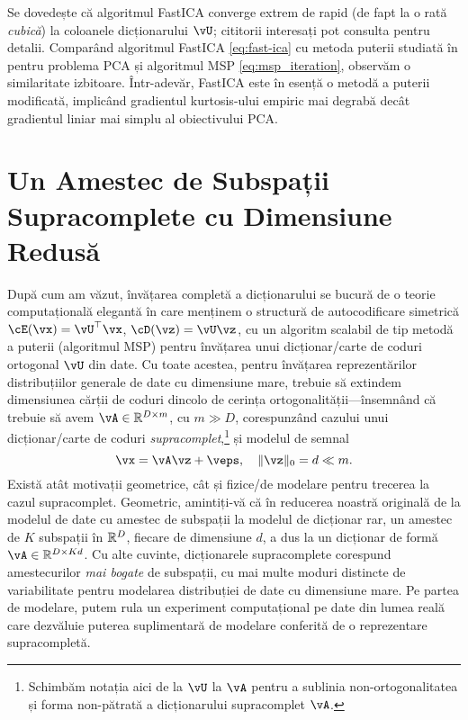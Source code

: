 \documentclass[../../book-main_ro.tex]{subfiles}
\begin{document}
Se dovedește că algoritmul FastICA converge extrem de rapid (de fapt la
o rată \textit{cubică}) la coloanele dicționarului $\vU$; cititorii interesați
pot consulta \cite{hyvarinen-1997} pentru detalii. 
Comparând algoritmul FastICA \eqref{eq:fast-ica} cu metoda puterii studiată
în  pentru problema PCA și algoritmul MSP
\eqref{eq:msp_iteration}, observăm o similaritate izbitoare. Într-adevăr, FastICA este în esență o metodă a puterii modificată, implicând gradientul kurtosis-ului empiric mai degrabă decât gradientul liniar mai simplu al obiectivului PCA.


\section{Un Amestec de Subspații Supracomplete cu Dimensiune Redusă}
\label{sec:dictionary_learning}
După cum am văzut, învățarea completă a dicționarului se bucură de o teorie computațională elegantă în care menținem o structură de autocodificare simetrică $\cE(\vx) = \vU^\top \vx$, $\cD(\vz) = \vU \vz$, cu un algoritm scalabil de tip metodă a puterii (algoritmul MSP) pentru învățarea unui dicționar/carte de coduri ortogonal $\vU$ din date. Cu toate acestea, pentru învățarea reprezentărilor distribuțiilor generale de date cu dimensiune mare, trebuie să extindem dimensiunea cărții de coduri dincolo de cerința ortogonalității---însemnând că trebuie să avem $\vA \in \R^{D \times m}$, cu $m \gg D$, corespunzând cazului unui dicționar/carte de coduri \textit{supracomplet},\footnote{Schimbăm notația aici de la $\vU$ la $\vA$ pentru a sublinia non-ortogonalitatea și forma non-pătrată a dicționarului supracomplet $\vA$.} și modelul de semnal
\begin{equation}\label{eq:model-DL-overcomplete}
    \vx =  \vA \vz + \veps,
    \quad
    \norm{\vz}_0 = d \ll m.
\end{equation}
Există atât motivații geometrice, cât și fizice/de modelare pentru trecerea la cazul supracomplet.
Geometric, amintiți-vă că în reducerea noastră originală de la modelul de date cu amestec de subspații la modelul de dicționar rar, un amestec de $K$ subspații în $\mathbb{R}^D$, fiecare de dimensiune $d$, a dus la un dicționar de formă $\vA \in \R^{D \times Kd}$.
Cu alte cuvinte, dicționarele supracomplete corespund amestecurilor \textit{mai bogate} de subspații, cu mai multe moduri distincte de variabilitate pentru modelarea distribuției de date cu dimensiune mare.
Pe partea de modelare, putem rula un experiment computațional pe date din lumea reală care dezvăluie puterea suplimentară de modelare conferită de o reprezentare supracompletă.
\end{document}
